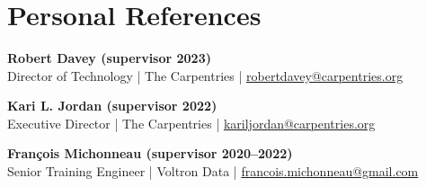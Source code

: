 \documentclass[10pt,letterpaper,sans]{modernresume} %
\title{ } %
\begin{document}
% 

\makecvtitle %



\vspace{5pt}

\section{Personal References}


\textbf{Robert Davey (supervisor 2023)}\\
Director of Technology |
The Carpentries |
\href{mailto:robertdavey@carpentries.org?subject=Reference for Zhian N. Kamvar}{robertdavey@carpentries.org }

\smallskip

\textbf{Kari L. Jordan (supervisor 2022)}\\
Executive Director |
The Carpentries |
\href{mailto:kariljordan@carpentries.org?subject=Reference for Zhian N. Kamvar}{kariljordan@carpentries.org}

\smallskip


\textbf{François Michonneau (supervisor 2020--2022)}\\
Senior Training Engineer |
Voltron Data |
\href{mailto:francois.michonneau@gmail.com?subject=Reference for Zhian N. Kamvar}{francois.michonneau@gmail.com}



\end{document}
